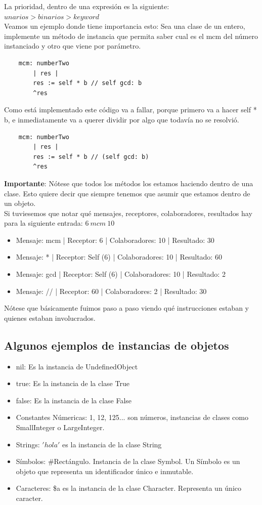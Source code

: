\documentclass[10pt,a4paper]{article}
\begin{document}
La prioridad, dentro de una expresión es la siguiente: $unarios > binarios > keyword$ \\
Veamos un ejemplo donde tiene importancia esto: Sea una clase de un entero, implemente un método de instancia que permita saber cual es el mcm del número instanciado y otro que viene por parámetro. \\
\begin{lstlisting}
    mcm: numberTwo 
        | res | 
        res := self * b // self gcd: b
        ^res
\end{lstlisting}
Como está implementado este código va a fallar, porque primero va a hacer self * b, e inmediatamente va a querer dividir por algo que todavía no se resolvió. 
\begin{lstlisting}
    mcm: numberTwo 
        | res |
        res := self * b // (self gcd: b)
        ^res
\end{lstlisting}
\textbf{Importante}: Nótese que todos los métodos los estamos haciendo dentro de una clase. Esto quiere decir que siempre tenemos que asumir que estamos dentro de un objeto. \\
Si tuviesemos que notar qué mensajes, receptores, colaboradores, resultados hay para la siguiente entrada: $6 \ mcm \ 10 $
\begin{itemize}
    \item Mensaje: mcm | Receptor: 6 | Colaboradores: 10 | Resultado: 30
    \item Mensaje: * | Receptor: Self (6) | Colaboradores: 10 | Resultado: 60 
    \item Mensaje: gcd | Receptor: Self (6) | Colaboradores: 10 | Resultado: 2
    \item Mensaje: // | Receptor: 60 | Colaboradores: 2 | Resultado: 30 
\end{itemize}
Nótese que básicamente fuimos paso a paso viendo qué instrucciones estaban y quienes estaban involucrados. 
\subsection*{Algunos ejemplos de instancias de objetos}
\begin{itemize}
    \item nil: Es la instancia de UndefinedObject
    \item true: Es la instancia de la clase True 
    \item false: Es la instancia de la clase False
    \item Constantes Númericas: 1, 12, 125... son números, instancias de clases como SmallInteger o LargeInteger.
    \item Strings: $'hola'$ es la instancia de la clase String
    \item Símbolos: \#Rectángulo. Instancia de la clase Symbol. Un Símbolo es un objeto que representa un identificador único e inmutable. 
    \item Caracteres: \$a es la instancia de la clase Character. Representa un único caracter.
\end{itemize}
\end{document}
